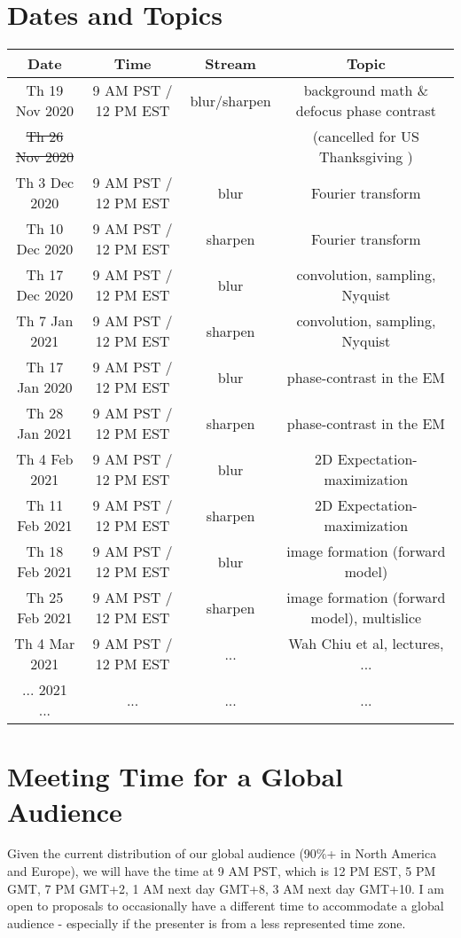 \documentclass[11pt, oneside]{article}   	%
\begin{document}
\section{Dates and Topics}

\begin{center}
\small
 \begin{tabular}{|| c c c c||} 
 \hline
 Date & Time & Stream & Topic \\ [0.5ex] 
 \hline\hline
Th 19 Nov 2020 & \tiny{9 AM PST / 12 PM EST} &  blur/sharpen & background math \& defocus phase contrast  \\ 
 \hline
\sout{Th 26 Nov 2020}  &   & & (cancelled for US Thanksgiving )    \\ 
 \hline
Th 3 Dec 2020 & \tiny{9 AM PST / 12 PM EST} & blur & Fourier transform   \\ 
 \hline
Th 10 Dec 2020 & \tiny{9 AM PST / 12 PM EST} & sharpen & Fourier transform   \\ 
 \hline
Th 17 Dec 2020 & \tiny{9 AM PST / 12 PM EST} & blur & convolution, sampling, Nyquist   \\ 
 \hline
Th 7 Jan 2021 & \tiny{9 AM PST / 12 PM EST} & sharpen & convolution, sampling, Nyquist   \\ 
 \hline
Th 17 Jan 2020 & \tiny{9 AM PST / 12 PM EST} & blur & phase-contrast in the EM   \\ 
 \hline
Th 28 Jan 2021 & \tiny{9 AM PST / 12 PM EST} & sharpen & phase-contrast in the EM   \\ 
 \hline
Th 4 Feb 2021 & \tiny{9 AM PST / 12 PM EST} & blur & 2D Expectation-maximization   \\ 
 \hline
Th 11 Feb 2021 & \tiny{9 AM PST / 12 PM EST} & sharpen & 2D Expectation-maximization   \\ 
 \hline
Th 18 Feb 2021 & \tiny{9 AM PST / 12 PM EST} & blur &  image formation (forward model)   \\ 
 \hline
Th 25 Feb 2021 & \tiny{9 AM PST / 12 PM EST} & sharpen & image formation (forward model), multislice   \\ 
 \hline
Th 4 Mar 2021 & \tiny{9 AM PST / 12 PM EST} & ... & Wah Chiu et al, lectures, ...  \\ [1ex] 
 \hline
 ... 2021 ... & ... &  ... & ...  \\ 
 \hline
\end{tabular}
\end{center}

\section{Meeting Time for a Global Audience}
Given the current distribution of our global audience (90\%+  in North America and Europe), we will have the time at 9 AM PST, which is 12 PM EST, 5 PM GMT, 7 PM GMT+2, 1 AM next day GMT+8, 3 AM next day GMT+10. I am open to proposals to occasionally have a different time to accommodate a global audience - especially if the presenter is from a less represented time zone.
\end{document}
